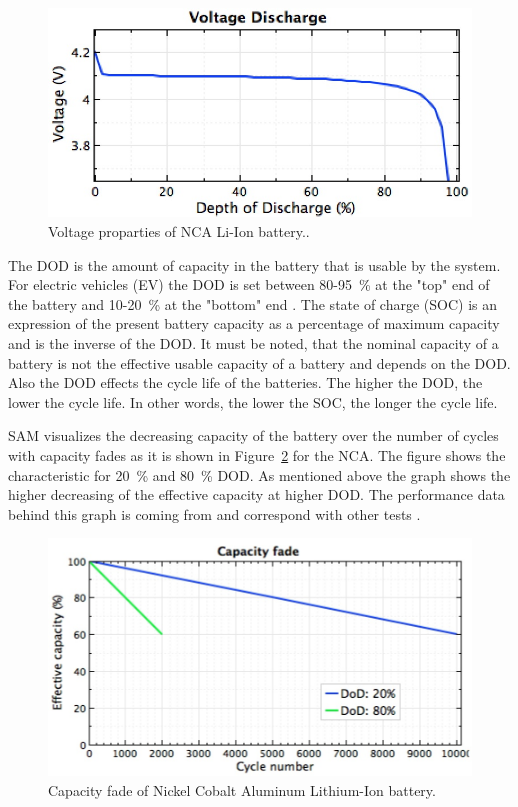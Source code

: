 \begin{figure}[!htbp]  
\centering
\includegraphics[width=0.6\linewidth]{FIG/EES_VoltageDischarge}
\caption[Voltage proparties of NCA Li-Ion battery.]{Voltage proparties of NCA Li-Ion battery..}\label{EES_VoltageDischarge}
\end{figure}



The DOD is the amount of capacity in the battery that is usable by the system. For electric vehicles (EV) the DOD is set between 80-95~\% at the "top" end of the battery and 10-20~\% at the "bottom" end \cite{Warner2014}. The state of charge (SOC) is an expression of the present battery capacity as a percentage of maximum capacity and is the inverse of the DOD. It must be noted, that the nominal capacity of a battery is not the effective usable capacity of a battery and depends on the DOD. Also the DOD effects the cycle life of the batteries. The higher the DOD, the lower the cycle life. In other words, the lower the SOC, the longer the cycle life. \cite{MitElectricVehilceTeam2008}



SAM visualizes the decreasing capacity of the battery over the number of cycles with capacity fades as it is shown in Figure~\ref{CapacityFade} for the NCA. The figure shows the characteristic for 20~\% and 80~\% DOD. As mentioned above the graph shows the higher decreasing of the effective capacity at higher DOD. The performance data behind this graph is coming from \cite{Dahn2011} and correspond with other tests \cite{Read2009}.
\begin{figure}[bhtp]  
\centering
\includegraphics[width=0.75\linewidth]{FIG/CapacityFade}
\caption[Capacity fade of Nickel Cobalt Aluminum Lithium-Ion battery.]{Capacity fade of Nickel Cobalt Aluminum Lithium-Ion battery.}\label{CapacityFade}
\end{figure}

